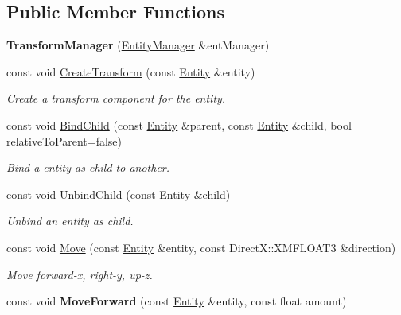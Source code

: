 \subsection*{Public Member Functions}
\begin{DoxyCompactItemize}
\item 
{\bfseries Transform\+Manager} (\hyperlink{class_ensum_1_1_components_1_1_entity_manager}{Entity\+Manager} \&ent\+Manager)\hypertarget{class_ensum_1_1_components_1_1_transform_manager_a6d9111abc5ab4fba9e31cf7b8096233b}{}\label{class_ensum_1_1_components_1_1_transform_manager_a6d9111abc5ab4fba9e31cf7b8096233b}

\item 
const void \hyperlink{class_ensum_1_1_components_1_1_transform_manager_a484089df7e71d762e6df10d70df01b97}{Create\+Transform} (const \hyperlink{struct_ensum_1_1_components_1_1_entity}{Entity} \&entity)\hypertarget{class_ensum_1_1_components_1_1_transform_manager_a484089df7e71d762e6df10d70df01b97}{}\label{class_ensum_1_1_components_1_1_transform_manager_a484089df7e71d762e6df10d70df01b97}

\begin{DoxyCompactList}\small\item\em Create a transform component for the entity. \end{DoxyCompactList}\item 
const void \hyperlink{class_ensum_1_1_components_1_1_transform_manager_a2d240e72b697be19aecae1527599480e}{Bind\+Child} (const \hyperlink{struct_ensum_1_1_components_1_1_entity}{Entity} \&parent, const \hyperlink{struct_ensum_1_1_components_1_1_entity}{Entity} \&child, bool relative\+To\+Parent=false)
\begin{DoxyCompactList}\small\item\em Bind a entity as child to another. \end{DoxyCompactList}\item 
const void \hyperlink{class_ensum_1_1_components_1_1_transform_manager_ab7dc49fe8a330efbe10c8b55f0bc0398}{Unbind\+Child} (const \hyperlink{struct_ensum_1_1_components_1_1_entity}{Entity} \&child)
\begin{DoxyCompactList}\small\item\em Unbind an entity as child. \end{DoxyCompactList}\item 
const void \hyperlink{class_ensum_1_1_components_1_1_transform_manager_a62314eeafd1d1368b82b1ea3002d3a71}{Move} (const \hyperlink{struct_ensum_1_1_components_1_1_entity}{Entity} \&entity, const Direct\+X\+::\+X\+M\+F\+L\+O\+A\+T3 \&direction)
\begin{DoxyCompactList}\small\item\em Move forward-\/x, right-\/y, up-\/z. \end{DoxyCompactList}\item 
const void {\bfseries Move\+Forward} (const \hyperlink{struct_ensum_1_1_components_1_1_entity}{Entity} \&entity, const float amount)\hypertarget{class_ensum_1_1_components_1_1_transform_manager_ae1748b0c5be7ff6c45ded730504f1b2e}{}\label{class_ensum_1_1_components_1_1_transform_manager_ae1748b0c5be7ff6c45ded730504f1b2e}


\end{DoxyCompactItemize}
